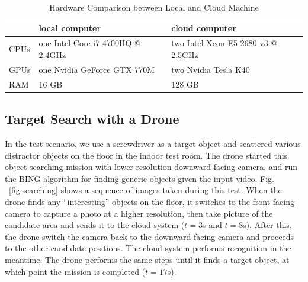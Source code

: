 \begin{table}[b]
 \caption{Hardware Comparison between Local and Cloud Machine}
 \label{table:hw}
 \begin{center}
  \begin{tabular}{ l m{3cm} m{3cm} }
   \hline
    & local computer  & cloud computer \\
   \hline
   CPUs & one Intel Core \newline i7-4700HQ @ 2.4GHz & two Intel Xeon \newline E5-2680 v3 @ 2.5GHz \\ \hline
   GPUs & one Nvidia \newline GeForce GTX 770M & two Nvidia Tesla K40 \\ \hline
   RAM & 16 GB & 128 GB \\ \hline
  \end{tabular}
 \end{center}
\end{table}

\subsection{Target Search with a Drone}
In the test scenario, we use a screwdriver as a target object and scattered various distractor objects on the floor in the indoor test room. 
The drone started this object searching mission with lower-resolution downward-facing camera, and run the BING algorithm for finding generic objects given the input video.
Fig. ~\ref{fig:searching} shows a sequence of images taken during this test. When the drone finds any ``interesting'' objects on the floor, it switches to the front-facing camera to capture a photo at a higher resolution, then take picture of the candidate area and sends it to the cloud system ($t=3$s and $t=8$s).
After this, the drone switch the camera back to the downward-facing camera and proceeds to the other candidate positions. 
The cloud system performs recognition in the meantime.
The drone performs the same steps until it finds a target object, at which point the mission is completed ($t=17$s).


